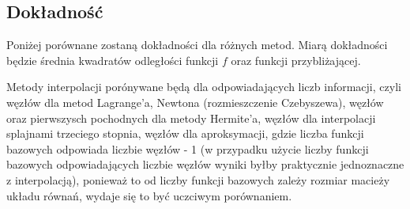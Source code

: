 \documentclass{article}
\begin{document}
\subsection{Dokładność}
Poniżej porównane zostaną dokładności dla różnych metod. Miarą dokładności będzie średnia kwadratów odległości funkcji $f$
oraz funkcji przybliżającej.

Metody interpolacji porónywane będą dla odpowiadających liczb informacji, czyli węzłów dla metod Lagrange'a, Newtona (rozmieszczenie Czebyszewa), 
węzłów oraz pierwszysch pochodnych dla metody Hermite'a, węzłów dla interpolacji splajnami trzeciego stopnia, 
węzłów dla aproksymacji, gdzie liczba funkcji bazowych odpowiada liczbie węzłów - 1 (w przypadku użycie liczby funkcji bazowych odpowiadających
liczbie węzłów wyniki byłby praktycznie jednoznaczne z interpolacją),
ponieważ to od liczby funkcji bazowych zależy rozmiar macieży układu równań, wydaje się to być uczciwym porównaniem.
\end{document}
